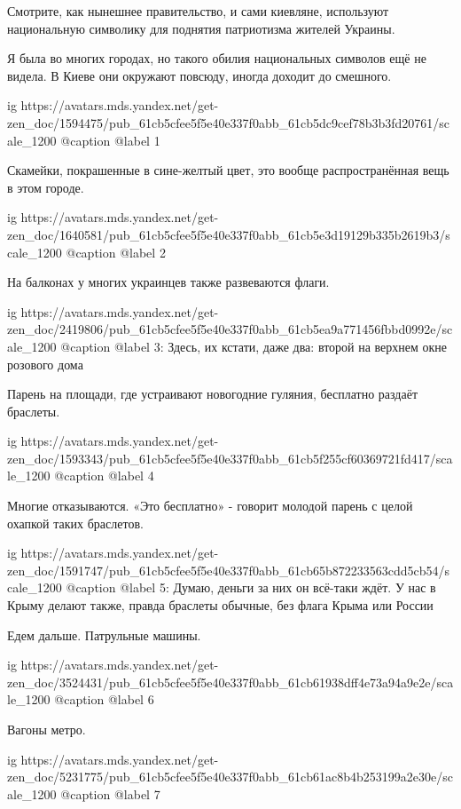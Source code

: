 \raggedcolumns
\begin{multicols}{3} %
\setlength{\parindent}{0pt}

Смотрите, как нынешнее правительство, и сами киевляне, используют национальную
символику для поднятия патриотизма жителей Украины.

Я была во многих городах, но такого обилия национальных символов ещё не видела.
В Киеве они окружают повсюду, иногда доходит до смешного.

\ifcmt
  ig https://avatars.mds.yandex.net/get-zen_doc/1594475/pub_61cb5cfee5f5e40e337f0abb_61cb5dc9cef78b3b3fd20761/scale_1200
  @caption @label 1
\fi

Скамейки, покрашенные в сине-желтый цвет, это вообще распространённая вещь в этом городе.

\ifcmt
  ig https://avatars.mds.yandex.net/get-zen_doc/1640581/pub_61cb5cfee5f5e40e337f0abb_61cb5e3d19129b335b2619b3/scale_1200
  @caption @label 2
\fi

На балконах у многих украинцев также развеваются флаги. 

\ifcmt
  ig https://avatars.mds.yandex.net/get-zen_doc/2419806/pub_61cb5cfee5f5e40e337f0abb_61cb5ea9a771456fbbd0992e/scale_1200
  @caption @label 3: Здесь, их кстати, даже два: второй на верхнем окне розового дома 
\fi

Парень на площади, где устраивают новогодние гуляния, бесплатно раздаёт
браслеты.  

\ifcmt
  ig https://avatars.mds.yandex.net/get-zen_doc/1593343/pub_61cb5cfee5f5e40e337f0abb_61cb5f255cf60369721fd417/scale_1200
  @caption @label 4
\fi


Многие отказываются. «Это бесплатно» - говорит молодой парень с
целой охапкой таких браслетов.

\ifcmt
  ig https://avatars.mds.yandex.net/get-zen_doc/1591747/pub_61cb5cfee5f5e40e337f0abb_61cb65b872233563cdd5cb54/scale_1200
  @caption @label 5: Думаю, деньги за них он всё-таки ждёт. У нас в Крыму делают также, правда браслеты обычные, без флага Крыма или России 
\fi

Едем дальше. Патрульные машины.

\ifcmt
  ig https://avatars.mds.yandex.net/get-zen_doc/3524431/pub_61cb5cfee5f5e40e337f0abb_61cb61938dff4e73a94a9e2e/scale_1200
  @caption @label 6
\fi

Вагоны метро.

\ifcmt
  ig https://avatars.mds.yandex.net/get-zen_doc/5231775/pub_61cb5cfee5f5e40e337f0abb_61cb61ac8b4b253199a2e30e/scale_1200
  @caption @label 7
\fi


\end{multicols}
